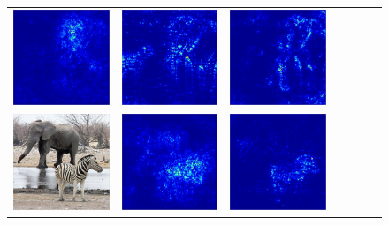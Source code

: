 \begin{figure}
\begin{center}
\begin{tabular}{ccccccc}
\includegraphics[width=0.14\linewidth,height=0.115\linewidth]{figs/examples/alexnet/soft/zeb-ele1_sali_387} &
\includegraphics[width=0.14\linewidth,height=0.115\linewidth]{figs/examples/vggnet/soft/zeb-ele1_sali_387} &
\includegraphics[width=0.14\linewidth,height=0.115\linewidth]{figs/examples/googlenet/soft/zeb-ele1_sali_387} \\
\includegraphics[width=0.14\linewidth,height=0.115\linewidth]{figs/examples/googlenet/soft/zeb-ele2} &
\includegraphics[width=0.14\linewidth,height=0.115\linewidth]{figs/examples/alexnet/soft/zeb-ele2_sali_341} &
\includegraphics[width=0.14\linewidth,height=0.115\linewidth]{figs/examples/vggnet/soft/zeb-ele2_sali_341} &

\end{tabular}
\end{center}
\end{figure}
